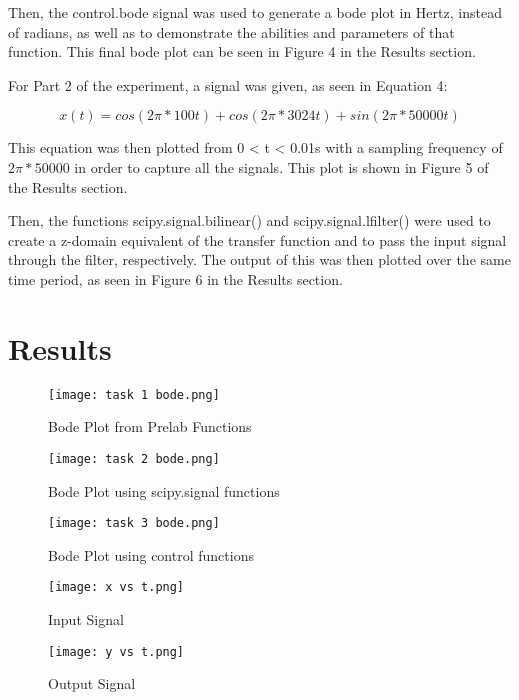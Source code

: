 \documentclass[12pt]{article}
\begin{document}
Then, the control.bode signal was used to generate a bode plot in Hertz, instead of radians, as well as to demonstrate the abilities and parameters of that function. This final bode plot can be seen in Figure 4 in the Results section.

For Part 2 of the experiment, a signal was given, as seen in Equation 4:

\begin{equation}
    x(t) = cos(2 \pi * 100t) + cos(2 \pi * 3024t) + sin(2 \pi * 50000t)
\end{equation}

This equation was then plotted from 0 < t < 0.01s with a sampling frequency of $2 \pi * 50000$ in order to capture all the signals. This plot is shown in Figure 5 of the Results section.

Then, the functions scipy.signal.bilinear() and scipy.signal.lfilter() were used to create a z-domain equivalent of the transfer function and to pass the input signal through the filter, respectively. The output of this was then plotted over the same time period, as seen in Figure 6 in the Results section.

\section{Results}

\begin{figure}[h!]
    \centering
    \texttt{[image: task 1 bode.png]}
    \caption{Bode Plot from Prelab Functions}
\end{figure}

\begin{figure}[h!]
    \centering
    \texttt{[image: task 2 bode.png]}
    \caption{Bode Plot using scipy.signal functions}
\end{figure}

\newpage

\begin{figure}[h!]
    \centering
    \texttt{[image: task 3 bode.png]}
    \caption{Bode Plot using control functions}
\end{figure}

\begin{figure}[h!]
    \centering
    \texttt{[image: x vs t.png]}
    \caption{Input Signal}
\end{figure}

\begin{figure}[h!]
    \centering
    \texttt{[image: y vs t.png]}
    \caption{Output Signal}
\end{figure}
\end{document}
